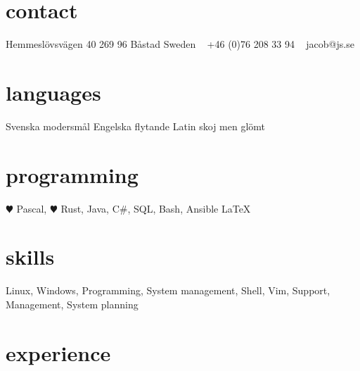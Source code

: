 \documentclass[]{cv-style}          %
\begin{document}
\lastupdated


\begin{aside}
%
\section{contact}
Hemmeslövsvägen 40
269 96 Båstad
Sweden
~
+46 (0)76 208 33 94
~
jacob@js.se
%
\section{languages}
Svenska modersmål
Engelska flytande
Latin skoj men glömt
%
\section{programming}
{\color{red} $\varheartsuit$} Pascal, {\color{red} $\varheartsuit$} Rust, Java, C\#, SQL, Bash, Ansible
\LaTeX{}
%
\end{aside}


\section{skills}
  \vspace{-0.2cm}

  Linux, Windows, Programming, System management, Shell, Vim, Support, Management, System planning


\section{experience}
\end{document}
